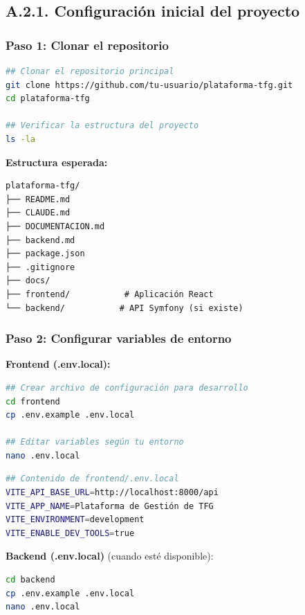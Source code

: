 \documentclass[12pt,a4paper,oneside]{report}
\begin{document}
\subsection{A.2.1. Configuración inicial del
proyecto}\label{a.2.1.-configuraciuxf3n-inicial-del-proyecto}

\subsubsection{Paso 1: Clonar el
repositorio}\label{paso-1-clonar-el-repositorio}

\begin{lstlisting}[language=bash]
## Clonar el repositorio principal
git clone https://github.com/tu-usuario/plataforma-tfg.git
cd plataforma-tfg

## Verificar la estructura del proyecto
ls -la
\end{lstlisting}

\textbf{Estructura esperada:}

\begin{lstlisting}
plataforma-tfg/
├── README.md
├── CLAUDE.md
├── DOCUMENTACION.md
├── backend.md
├── package.json
├── .gitignore
├── docs/
├── frontend/           # Aplicación React
└── backend/           # API Symfony (si existe)
\end{lstlisting}

\subsubsection{Paso 2: Configurar variables de
entorno}\label{paso-2-configurar-variables-de-entorno}

\textbf{Frontend (.env.local):}

\begin{lstlisting}[language=bash]
## Crear archivo de configuración para desarrollo
cd frontend
cp .env.example .env.local

## Editar variables según tu entorno
nano .env.local
\end{lstlisting}

\begin{lstlisting}[language=bash]
## Contenido de frontend/.env.local
VITE_API_BASE_URL=http://localhost:8000/api
VITE_APP_NAME=Plataforma de Gestión de TFG
VITE_ENVIRONMENT=development
VITE_ENABLE_DEV_TOOLS=true
\end{lstlisting}

\textbf{Backend (.env.local)} (cuando esté disponible):

\begin{lstlisting}[language=bash]
cd backend
cp .env.example .env.local
nano .env.local
\end{lstlisting}
\end{document}
